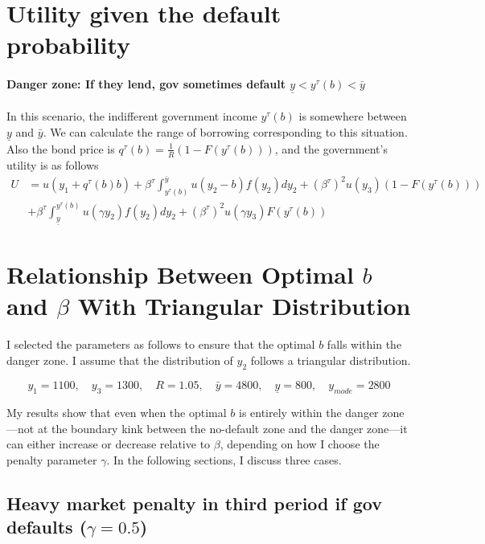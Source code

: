 \documentclass{article}
\begin{document}
\section{Utility given the default probability}

\paragraph{Danger zone: If they lend, gov sometimes default $\underline{y}<y^{\tau}(b)<\bar{y}$}
In this scenario, the indifferent government income $y^{\tau}(b)$ is somewhere between $\underline{y}$ and $\bar{y}$. We can calculate the range of borrowing corresponding to this situation. Also the bond price is $q^{\tau}(b)=\frac1R (1-F(y^{\tau}(b)))$, and the government's utility is as follows
\begin{align*}
U &=  u(y_1 + q^{\tau}(b)b) + \beta^{\tau}\int_{y^{\tau}(b)}^{\bar{y}} u(y_2-b)f(y_2)dy_2 + \left(\beta^{\tau}\right)^2 u(y_3)(1-F(y^{\tau}(b)))\\
& + \beta^{\tau}\int_{\underline{y}}^{y^{\tau}(b)} u(\gamma y_2)f(y_2)dy_2 + \left(\beta^{\tau}\right)^2 u(\gamma y_3)F(y^{\tau}(b))
\end{align*}



\section{Relationship Between Optimal $b$ and $\beta$ With Triangular Distribution}

I selected the parameters as follows to ensure that the optimal $b$ falls within the danger zone. I assume that the distribution of $y_2$ follows a triangular distribution.

$$y_1 = 1100, \quad y_3 = 1300, \quad R=1.05, \quad \bar{y} = 4800, \quad \underline{y} = 800, \quad y_{mode} = 2800 $$

My results show that even when the optimal $b$ is entirely within the danger zone—not at the boundary kink between the no-default zone and the danger zone—it can either increase or decrease relative to $\beta$, depending on how I choose the penalty parameter $\gamma$. In the following sections, I discuss three cases.


\subsection{Heavy market penalty in third period if gov defaults ($\gamma = 0.5$)}
\end{document}

